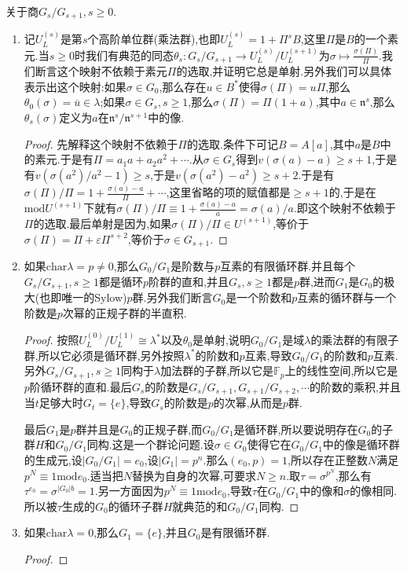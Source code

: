 关于商$G_s/G_{s+1},s\ge0$.
\begin{enumerate}
	\item 记$U_L^{(s)}$是第$s$个高阶单位群(乘法群),也即$U_L^{(s)}=1+\Pi^sB$,这里$\Pi$是$B$的一个素元.当$s\ge0$时我们有典范的同态$\theta_s:G_s/G_{s+1}\to U_L^{(s)}/U_L^{(s+1)}$为$\sigma\mapsto\frac{\sigma(\Pi)}{\Pi}$.我们断言这个映射不依赖于素元$\Pi$的选取,并证明它总是单射.另外我们可以具体表示出这个映射:如果$\sigma\in G_0$,那么存在$u\in B^*$使得$\sigma(\Pi)=u\Pi$,那么$\theta_0(\sigma)=\overline{u}\in\lambda$;如果$\sigma\in G_s,s\ge1$,那么$\sigma(\Pi)=\Pi(1+a)$,其中$a\in\mathfrak{n}^s$,那么$\theta_s(\sigma)$定义为$a$在$\mathfrak{n}^s/\mathfrak{n}^{s+1}$中的像.
	\begin{proof}
		
		先解释这个映射不依赖于$\Pi$的选取.条件下可记$B=A[a]$,其中$a$是$B$中的素元.于是有$\Pi=a_1a+a_2a^2+\cdots$.从$\sigma\in G_s$得到$v(\sigma(a)-a)\ge s+1$,于是有$v(\sigma(a^2)/a^2-1)\ge s$,于是$v(\sigma(a^2)-a^2)\ge s+2$.于是有$\sigma(\Pi)/\Pi=1+\frac{\sigma(a)-a}{\Pi}+\cdots$,这里省略的项的赋值都是$\ge s+1$的,于是在$\mathrm{mod}U^{(s+1)}$下就有$\sigma(\Pi)/\Pi\equiv1+\frac{\sigma(a)-a}{a}=\sigma(a)/a$.即这个映射不依赖于$\Pi$的选取.最后单射是因为,如果$\sigma(\Pi)/\Pi\in U^{(s+1)}$,等价于$\sigma(\Pi)=\Pi+\varepsilon\Pi^{s+2}$,等价于$\sigma\in G_{s+1}$.
	\end{proof}
	\item 如果$\mathrm{char}\lambda=p\not=0$,那么$G_0/G_1$是阶数与$p$互素的有限循环群.并且每个$G_s/G_{s+1},s\ge1$都是循环$p$阶群的直和,并且$G_s,s\ge1$都是$p$群,进而$G_1$是$G_0$的极大(也即唯一的Sylow)$p$群.另外我们断言$G_0$是一个阶数和$p$互素的循环群与一个阶数是$p$次幂的正规子群的半直积.
	\begin{proof}
		
		按照$U_L^{(0)}/U_L^{(1)}\cong\lambda^*$以及$\theta_0$是单射,说明$G_0/G_1$是域$\lambda$的乘法群的有限子群,所以它必须是循环群,另外按照$\lambda^*$的阶数和$p$互素,导致$G_0/G_1$的阶数和$p$互素.另外$G_s/G_{s+1},s\ge1$同构于$\lambda$加法群的子群,所以它是$\mathbb{F}_p$上的线性空间,所以它是$p$阶循环群的直和.最后$G_s$的阶数是$G_s/G_{s+1},G_{s+1}/G_{s+2},\cdots$的阶数的乘积,并且当$t$足够大时$G_t=\{e\}$,导致$G_s$的阶数是$p$的次幂,从而是$p$群.
		
		\qquad
		
		最后$G_1$是$p$群并且是$G_0$的正规子群,而$G_0/G_1$是循环群,所以要说明存在$G_0$的子群$H$和$G_0/G_1$同构.这是一个群论问题.设$\sigma\in G_0$使得它在$G_0/G_1$中的像是循环群的生成元,设$|G_0/G_1|=e_0$,设$|G_1|=p^n$.那么$(e_0,p)=1$,所以存在正整数$N$满足$p^N\equiv1\mathrm{mod}e_0$.适当把$N$替换为自身的次幂,可要求$N\ge n$.取$\tau=\sigma^{p^N}$,那么有$\tau^{e_0}=\sigma^{|G_0|b}=1$.另一方面因为$p^N\equiv1\mathrm{mod}e_0$,导致$\tau$在$G_0/G_1$中的像和$\sigma$的像相同.所以被$\tau$生成的$G_0$的循环子群$H$就典范的和$G_0/G_1$同构.
	\end{proof}
	\item 如果$\mathrm{char}\lambda=0$,那么$G_1=\{e\}$,并且$G_0$是有限循环群.
	\begin{proof}
		

\end{proof}
\end{enumerate}
